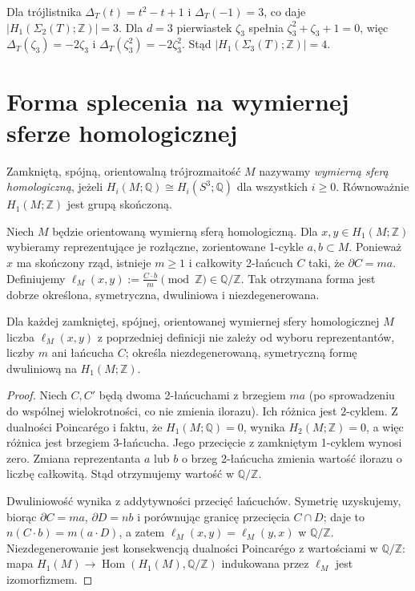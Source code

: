\begin{przyklad}
Dla trójlistnika $\Delta_T(t)=t^2-t+1$ i
$\Delta_T(-1)=3$, co daje
$|H_1(\Sigma_2(T);\mathbb Z)|=3$.
Dla $d=3$ pierwiastek $\zeta_3$ spełnia
$\zeta_3^2+\zeta_3+1=0$, więc
$\Delta_T(\zeta_3)=-2\zeta_3$ i
$\Delta_T(\zeta_3^2)=-2\zeta_3^2$.
Stąd $|H_1(\Sigma_3(T);\mathbb Z)|=4$.
\end{przyklad}

\section{Forma splecenia na wymiernej sferze homologicznej}
\label{sec:kt-linking-pairing}

\begin{definicja}
Zamkniętą, spójną, orientowalną trójrozmaitość $M$
nazywamy \emph{wymierną sferą homologiczną}, jeżeli
$H_i(M;\mathbb Q)\cong H_i(S^3;\mathbb Q)$
dla wszystkich $i\geq0$. Równoważnie $H_1(M;\mathbb Z)$
jest grupą skończoną.
\end{definicja}

\begin{definicja}
Niech $M$ będzie orientowaną wymierną sferą homologiczną.
Dla $x,y\in H_1(M;\mathbb Z)$ wybieramy reprezentujące
je rozłączne, zorientowane 1-cykle $a,b\subset M$.
Ponieważ $x$ ma skończony rząd, istnieje $m\geq1$
i całkowity 2-łańcuch $C$ taki, że $\partial C=ma$.
Definiujemy
$\ell_M(x,y):=\frac{C\cdot b}{m}\pmod{\mathbb Z}
\in\mathbb Q/\mathbb Z$.
Tak otrzymana forma jest dobrze określona, symetryczna,
dwuliniowa i niezdegenerowana.
\end{definicja}

\begin{stwierdzenie}
Dla każdej zamkniętej, spójnej, orientowanej wymiernej
sfery homologicznej $M$ liczba $\ell_M(x,y)$ z poprzedniej
definicji nie zależy od wyboru reprezentantów, liczby $m$
ani łańcucha $C$; określa niezdegenerowaną, symetryczną
formę dwuliniową na $H_1(M;\mathbb Z)$.
\end{stwierdzenie}

\begin{proof}
Niech $C,C'$ będą dwoma 2-łańcuchami z brzegiem
$m a$ (po sprowadzeniu do wspólnej wielokrotności,
co nie zmienia ilorazu). Ich różnica jest 2-cyklem.
Z dualności Poincarégo i faktu, że $H_1(M;\mathbb Q)=0$,
wynika $H_2(M;\mathbb Z)=0$, a więc różnica jest
brzegiem 3-łańcucha. Jego przecięcie z zamkniętym
1-cyklem wynosi zero. Zmiana reprezentanta $a$ lub $b$
o brzeg 2-łańcucha zmienia wartość ilorazu o liczbę
całkowitą. Stąd otrzymujemy wartość w $\mathbb Q/\mathbb Z$.

Dwuliniowość wynika z addytywności przecięć łańcuchów.
Symetrię uzyskujemy, biorąc $\partial C=ma$,
$\partial D=nb$ i porównując granicę przecięcia
$C\cap D$; daje to $n(C\cdot b)=m(a\cdot D)$,
a zatem $\ell_M(x,y)=\ell_M(y,x)$ w $\mathbb Q/\mathbb Z$.
Niezdegenerowanie jest konsekwencją dualności
Poincarégo z wartościami w $\mathbb Q/\mathbb Z$:
mapa $H_1(M)\to\operatorname{Hom}(H_1(M),\mathbb Q/\mathbb Z)$
indukowana przez $\ell_M$ jest izomorfizmem.
\end{proof}

